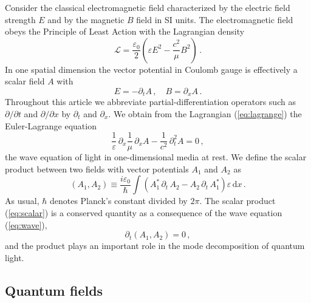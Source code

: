 \documentclass[12pt,amsmath,amssymb]{article}
\numberwithin{equation}{section}
\begin{document}
Consider the classical electromagnetic field characterized by the
electric field strength $E$ and by the magnetic $B$ field in SI units.
The electromagnetic field obeys the Principle of Least Action
\cite{LL2} with the Lagrangian density \cite{GlauberLewen}
\begin{equation}
\label{eq:lagrange}
{\mathscr L}=\frac{\varepsilon_0}{2}
\left(\varepsilon E^2 -\frac{c^2}{\mu} B^2\right) \,.
\end{equation}
In one spatial dimension the vector potential in Coulomb gauge
\cite{Cohen} is effectively a scalar field $A$ with
\begin{equation}
\label{eq:vectorpotential}
E=-\partial_t A\,,\quad B=\partial_x A \,.
\end{equation}
Throughout this article we abbreviate partial-differentiation operators
such as $\partial/\partial t$ and $\partial/\partial x$
by $\partial_t$ and $\partial_x$.
We obtain from the Lagrangian (\ref{eq:lagrange})
the Euler-Lagrange equation
\begin{equation}
\label{eq:wave}
\frac{1}{\varepsilon}\,\partial_x \frac{1}{\mu}\,\partial_x A -
\frac{1}{c^2}\, \partial_t^2 A = 0\,,
\end{equation}
the wave equation of light in one-dimensional media at rest.
We define the scalar product between two fields with
vector potentials $A_1$ and $A_2$ as
\begin{equation}
\label{eq:scalar}
\left(A_1,A_2\right) \equiv \frac{i\varepsilon_0}{\hbar}
\int \left(A_1^*\,\partial_t\, A_2 - A_2 \,\partial_t \,A_1^*\right) \varepsilon\,
\mathrm{d}x\,.
\end{equation}
As usual, $\hbar$ denotes Planck's constant divided by $2\pi$.
The scalar product (\ref{eq:scalar}) is a conserved quantity
as a consequence of the wave equation  (\ref{eq:wave}),
\begin{equation}
\partial_t\left(A_1,A_2\right) =0\,,
\end{equation}
and the product plays an important role in the mode
decomposition of quantum light.

\subsection{Quantum fields}
\end{document}
